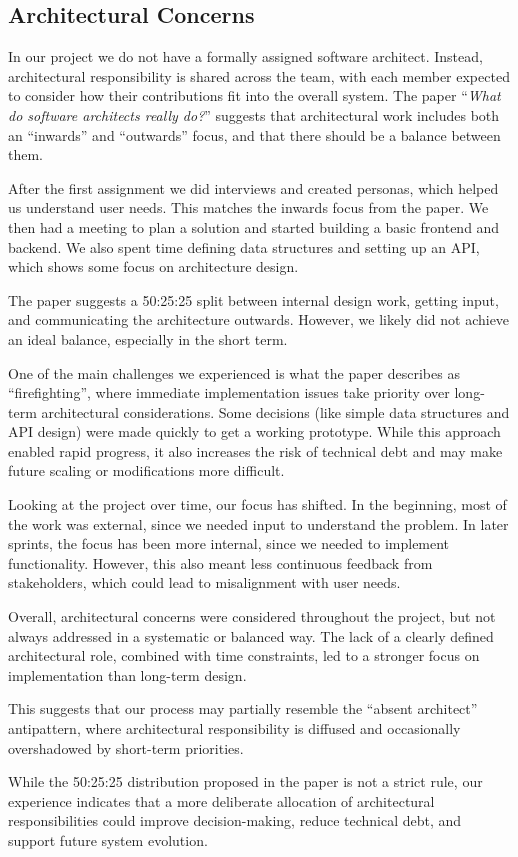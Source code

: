 \subsection{Architectural Concerns}
In our project we do not have a formally assigned software architect.
Instead, architectural responsibility is shared across the team,
with each member expected to consider how their contributions fit into the overall system.
The paper “\textit{What do software architects really do?}”\cite{SoftwareArchitectsReallyDo}
suggests that architectural work includes both an “inwards” and “outwards” focus,
and that there should be a balance between them.

After the first assignment we did interviews and created personas, which helped us understand user needs.
This matches the inwards focus from the paper.
We then had a meeting to plan a solution and started building a basic frontend and backend.
We also spent time defining data structures and setting up an API, which shows some focus on architecture design.

The paper suggests a 50:25:25 split between internal design work, getting input, and communicating the architecture outwards.
However, we likely did not achieve an ideal balance, especially in the short term.

One of the main challenges we experienced is what the paper describes as “firefighting”,
where immediate implementation issues take priority over long-term architectural considerations.
Some decisions (like simple data structures and API design) were made quickly to get a working prototype.
While this approach enabled rapid progress, it also increases the risk of technical debt
and may make future scaling or modifications more difficult.

Looking at the project over time, our focus has shifted.
In the beginning, most of the work was external,
since we needed input to understand the problem.
In later sprints, the focus has been more internal,
since we needed to implement functionality.
However, this also meant less continuous feedback from stakeholders,
which could lead to misalignment with user needs.

Overall, architectural concerns were considered throughout the project,
but not always addressed in a systematic or balanced way.
The lack of a clearly defined architectural role, combined with time constraints,
led to a stronger focus on implementation than long-term design.

This suggests that our process may partially resemble the “absent architect” antipattern,
where architectural responsibility is diffused and occasionally overshadowed by short-term priorities.

While the 50:25:25 distribution proposed in the paper is not a strict rule,
our experience indicates that a more deliberate allocation of architectural responsibilities
could improve decision-making, reduce technical debt, and support future system evolution.
